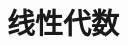 \documentclass[../main.tex]{subfiles}
\begin{document}
\setcounter{chapter}{2}
\chapter{线性代数}\label{cha:linear_algebra}
\end{document}
